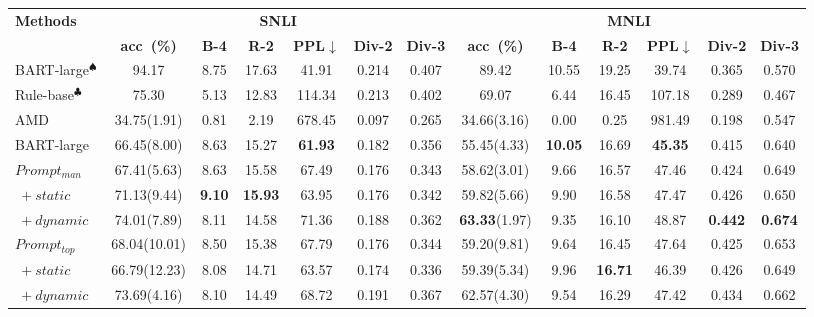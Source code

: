 \begin{table}[t!]
	\setlength\tabcolsep{4pt}
	\centering
	\small
	\begin{tabular}{l|cccccc|cccccc}
		\toprule
		\multirow{2}{*}{\textbf{Methods}} & \multicolumn{6}{c|}{\textbf{SNLI}} &\multicolumn{6}{c}{\textbf{MNLI}}  \\
		
		&\textbf{acc~(\%)}   &\textbf{B-4}  &\textbf{R-2}  &\textbf{PPL$\downarrow$}    &\textbf{Div-2}  &\textbf{Div-3}  &\textbf{acc~(\%)}   &\textbf{B-4}  &\textbf{R-2}  &\textbf{PPL$\downarrow$}     &\textbf{Div-2}  &\textbf{Div-3}   \\
		\midrule
		BART-large$^\spadesuit$  & 94.17 & 8.75 & 17.63&41.91 &0.214 &0.407 &89.42 &10.55 &19.25 & 39.74& 0.365& 0.570\\
		\midrule
		Rule-base$^\clubsuit$  & 75.30 & 5.13 & 12.83 & 114.34 & 0.213& 0.402&69.07 &6.44 &16.45 &107.18 &0.289 &0.467 \\
		\midrule
		AMD  & 34.75(1.91) & 0.81 & 2.19 & 678.45 & 0.097& 0.265& 34.66(3.16)&0.00 &0.25 &981.49 &0.198 & 0.547\\
		BART-large  & 66.45(8.00) & 8.63 & 15.27 &\textbf{61.93} &0.182 &0.356 &55.45(4.33) &\textbf{10.05} &16.69 &\textbf{45.35} &0.415 &0.640 \\
		\midrule
		$Prompt_{man}$ & 67.41(5.63) & 8.63 &15.58 & 67.49& 0.176& 0.343& 58.62(3.01)&9.66 &16.57 &47.46 &0.424 &0.649 \\
		$\ +static$ & 71.13(9.44) & \textbf{9.10} &\textbf{15.93} &63.95 &0.176 &0.342 &59.82(5.66) &9.90 &16.58 &47.47 &0.426 &0.650 \\
		$\ +dynamic$ & 74.01(7.89) & 8.11 &14.58 &71.36 &0.188 &0.362 &\textbf{63.33}(1.97) &9.35 &16.10 &48.87 &\textbf{0.442} &\textbf{0.674}  \\
		\midrule
		$Prompt_{top}$ & 68.04(10.01)& 8.50& 15.38& 67.79&0.176 &0.344 &59.20(9.81) &9.64 &16.45 &47.64 &0.425 &0.653 \\
		$\ +static$ & 66.79(12.23) &8.08 & 14.71& 63.57& 0.174& 0.336& 59.39(5.34)& 9.96& \textbf{16.71}& 46.39 & 0.426& 0.649\\
		$\ +dynamic$ & 73.69(4.16) & 8.10& 14.49& 68.72& 0.191& 0.367& 62.57(4.30)& 9.54& 16.29& 47.42& 0.434& 0.662\\

\end{tabular}
\end{table}
